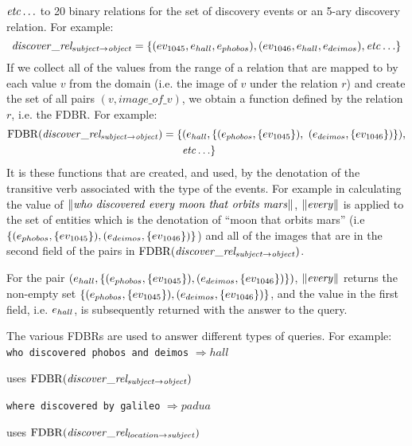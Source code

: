 \documentclass[../main.tex]{subfiles}
\begin{document}
\begin{refsection}
\noindent $\mathit{etc}\ldots$ to 20 binary relations for  the set of discovery events or an 5-ary discovery relation. For example:
\begin{equation*}
	\mathit{discover\_rel_{subject \rightarrow object}} = \{(ev_{\mathrm{1045}}, e_{hall}, e_{phobos}), (ev_{\mathrm{1046}}, e_{hall}, e_{deimos}), \mathit{etc}\ldots\}
\end{equation*}
If we collect all of the values from the range of a relation that are mapped to by each value $v$ from the domain (i.e. the image of $v$ under the relation $r$) and create the set of all pairs $(v, image\_of\_v)$, we obtain a function defined by the relation $r$, i.e. the FDBR. For example:
\begin{equation*}
	\begin{split}
	\mathrm{FDBR}({\mathit{discover\_rel_{subject \rightarrow object}}}) = \{& ( e_{hall}, \{(e_{phobos}, \{ev_{\mathrm{1045}}\}),\ (e_{deimos}, \{ev_{\mathrm{1046}}\}) \}),\\
	&\mathit{etc}\ldots\}
	\end{split}
\end{equation*}
It is these functions that are created, and used, by the denotation of the transitive verb associated with the type of the events. For example in calculating the value of $\meaningof{who\ discovered\ every\ moon\ that\ orbits\ mars}$, $\lVert \mathit{every} \rVert$ is applied to the set of entities which is the denotation of ``moon that orbits mars'' (i.e $\{ (e_{phobos}, \{ev_{\mathrm{1045}}\}),\\ (e_{deimos}, \{ev_{\mathrm{1046}}\})\}$) and all of the images that are in the second field of the pairs in $\mathrm{FDBR}({\mathit{discover\_rel_{subject \rightarrow object}}})$.

For the pair $(e_{hall}, \{(e_{phobos}, \{ev_{\mathrm{1045}}\}), (e_{deimos}, \{ev_{\mathrm{1046}}\})\})$, $\lVert \mathit{every} \rVert$ returns the non-empty set $\{(e_{phobos}, \{ev_{\mathrm{1045}}\}), (e_{deimos}, \{ev_{\mathrm{1046}}\})\}$, and the value in the first field, i.e. $e_{hall}$, is subsequently returned with the answer to the query.

The various FDBRs are used to answer different types of queries. For example: \\

\noindent \texttt{who discovered phobos and deimos} $\Rightarrow hall$

uses $\mathrm{FDBR}({\mathit{discover\_rel_{subject \rightarrow object}}})$

\noindent \texttt{where discovered by galileo} $\Rightarrow \mathit{padua}$

uses $\mathrm{FDBR}({\mathit{discover\_rel_{location \rightarrow subject}}})$


\end{refsection}
\end{document}
